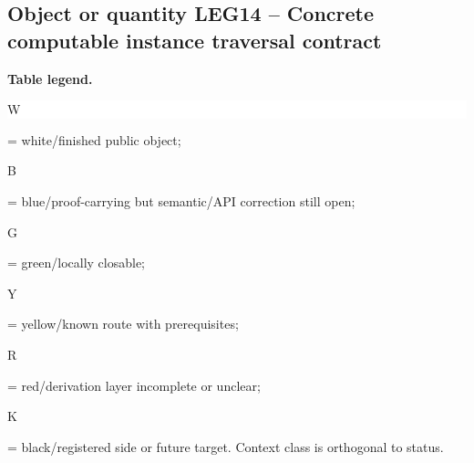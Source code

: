 \subsection*{Object or quantity LEG14 -- Concrete computable instance traversal contract}
\hypertarget{objproof:LEG14}{}
\par\smallskip\noindent\begin{minipage}{0.99\linewidth}\footnotesize\raggedright\textbf{Table legend.} \colorbox{white}{\strut W} = white/finished public object; \colorbox{cyan!20}{\strut B} = blue/proof-carrying but semantic/API correction still open; \colorbox{green!18}{\strut G} = green/locally closable; \colorbox{yellow!25}{\strut Y} = yellow/known route with prerequisites; \colorbox{red!20}{\strut R} = red/derivation layer incomplete or unclear; \colorbox{black!18}{\strut K} = black/registered side or future target. Context class is orthogonal to status.\end{minipage}\par\vspace{0.25em}
